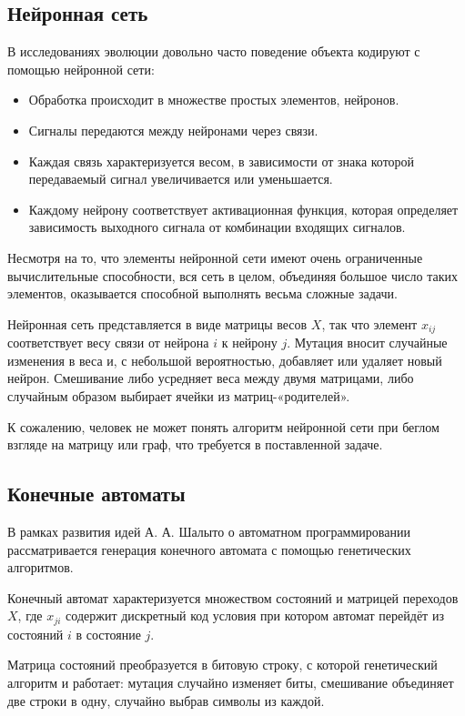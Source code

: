 \documentclass[utf8,a5paper,portrait,12pt]{eskdtext}
\begin{document}
\subsection{Нейронная сеть}

В исследованиях эволюции\cite{communication} довольно часто поведение объекта 
кодируют с помощью нейронной сети:\cite{neural}
\begin{itemize}
  \item Обработка происходит в множестве простых элементов, нейронов.
  \item Сигналы передаются между нейронами через связи.
  \item Каждая связь характеризуется весом, в зависимости от знака которой
        передаваемый сигнал увеличивается или уменьшается.
  \item Каждому нейрону соответствует активационная функция, которая определяет 
        зависимость выходного сигнала от комбинации входящих сигналов.
\end{itemize}

Несмотря на то, что элементы нейронной сети имеют очень ограниченные
вычислительные способности, вся сеть в целом, объединяя большое число таких
элементов, оказывается способной выполнять весьма сложные задачи.

Нейронная сеть представляется в виде матрицы весов $X$, так что элемент
$x_{ij}$ соответствует весу связи от нейрона $i$ к нейрону $j$. Мутация
вносит случайные изменения в веса и, с небольшой вероятностью, добавляет или
удаляет новый нейрон. Смешивание либо усредняет веса между двумя матрицами, либо
случайным образом выбирает ячейки из матриц-«родителей».

К сожалению, человек не может понять алгоритм нейронной сети при беглом взгляде
на матрицу или граф, что требуется в поставленной задаче.

\subsection{Конечные автоматы}

В рамках развития идей А. А. Шалыто о автоматном программировании
рассматривается генерация конечного автомата с помощью генетических
алгоритмов.\cite{shalyto}

Конечный автомат характеризуется множеством состояний и матрицей переходов $X$,
где $x_{ji}$ содержит дискретный код условия при котором автомат перейдёт из
состояний $i$ в состояние $j$.

Матрица состояний преобразуется в битовую строку, с которой генетический
алгоритм и работает: мутация случайно изменяет биты, смешивание объединяет две
строки в одну, случайно выбрав символы из каждой.
\end{document}
